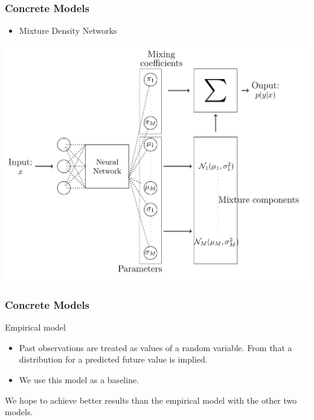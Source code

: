 \documentclass[18pt]{beamer}
\begin{document}
\begin{frame}
  \frametitle{Concrete Models}
  
  \begin{itemize}
  \item Mixture Density Networks
  \end{itemize}

  \begin{center}
    \includegraphics[scale=0.15]{images/mdn}
  \end{center}
  
\end{frame}

\begin{frame}[t]
  \frametitle{Concrete Models}
  Empirical model
  \begin{itemize}
  \item Past observations are treated as values of a random variable. From that a distribution for a predicted future value is implied.
  \item We use this model as a baseline.
  \end{itemize}
  We hope to achieve better results than the empirical model with the other two models.

\end{frame}
\end{document}
